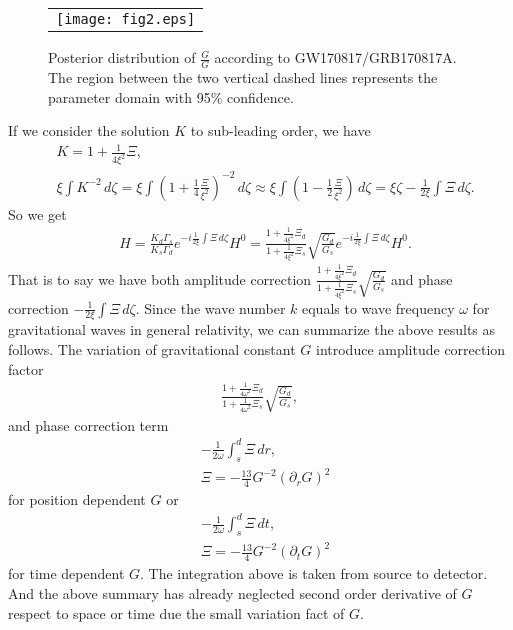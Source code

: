 \documentclass[prd,aps,a4paper,superscriptaddress,onecolumn,nofootinbib]{revtex4}
\begin{document}
\begin{figure}
\begin{tabular}{c}
\texttt{[image: fig2.eps]}
\end{tabular}
\caption{Posterior distribution of $\frac{\dot{G}}{G}$ according to GW170817/GRB170817A. The region between the two vertical dashed lines represents the parameter domain with 95\% confidence.}\label{fig2}
\end{figure}

If we consider the solution $K$ to sub-leading order, we have
\begin{align}
&K=1+\frac{1}{4\xi^2}\Xi,\\
&\xi\int K^{-2}\,d\zeta=\xi\int (1+\frac{1}{4}\frac{\Xi}{\xi^2})^{-2}\,d\zeta\approx\xi\int (1-\frac{1}{2}\frac{\Xi}{\xi^2})\,d\zeta=\xi \zeta- \frac{1}{2\xi}\int\Xi\,d\zeta.
\end{align}
So we get
\begin{align}
&H=\frac{K_d\Gamma_s}{K_s\Gamma_d}e^{-i\frac{1}{2\xi}\int\Xi\,d\zeta}H^0=\frac{1+\frac{1}{4\xi^2}\Xi_d}{1+\frac{1}{4\xi^2}\Xi_s}\sqrt{\frac{G_d}{G_s}}e^{-i\frac{1}{2\xi}\int\Xi\,d\zeta}H^0.
\end{align}
That is to say we have both amplitude correction $\frac{1+\frac{1}{4\xi^2}\Xi_d}{1+\frac{1}{4\xi^2}\Xi_s}\sqrt{\frac{G_d}{G_s}}$ and phase correction $-\frac{1}{2\xi}\int\Xi\,d\zeta$. Since the wave number $k$ equals to wave frequency $\omega$ for gravitational waves in general relativity, we can summarize the above results as follows. The variation of gravitational constant $G$ introduce amplitude correction factor
\begin{align}
\frac{1+\frac{1}{4\omega^2}\Xi_d}{1+\frac{1}{4\omega^2}\Xi_s}\sqrt{\frac{G_d}{G_s}},
\end{align}
and phase correction term
\begin{align}
&-\frac{1}{2\omega}\int_s^d\Xi\,dr,\\
&\Xi=-\frac{13}{4}G^{-2}(\partial_rG)^2
\end{align}
for position dependent $G$ or
\begin{align}
&-\frac{1}{2\omega}\int_s^d\Xi\,dt,\\
&\Xi=-\frac{13}{4}G^{-2}(\partial_tG)^2
\end{align}
for time dependent $G$. The integration above is taken from source to detector. And the above summary has already neglected second order derivative of $G$ respect to space or time due the small variation fact of $G$.
\end{document}
